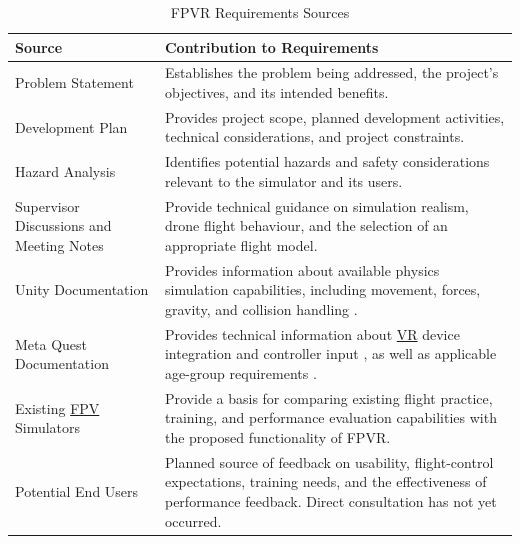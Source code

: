 \documentclass[12pt]{article}
\begin{document}
\begin{table}[htbp]
\centering
\small
\caption{FPVR Requirements Sources}
\label{tab:requirements-sources}

\begin{tabularx}{\textwidth}{@{}p{3.5cm} X@{}}
\toprule
\textbf{Source} &
\textbf{Contribution to Requirements} \\
\midrule

Problem Statement &
Establishes the problem being addressed, the
project's objectives, and its intended benefits. \\

\addlinespace

Development Plan &
Provides project scope, planned development
activities, technical considerations, and
project constraints. \\

\addlinespace

Hazard Analysis &
Identifies potential hazards and safety
considerations relevant to the simulator
and its users. \\

\addlinespace

Supervisor Discussions and Meeting Notes &
Provide technical guidance on simulation realism,
drone flight behaviour, and the selection of
an appropriate flight model. \\

\addlinespace

Unity Documentation &
Provides information about available physics
simulation capabilities, including movement,
forces, gravity, and collision handling
\cite{unityRigidbody}. \\

\addlinespace

Meta Quest Documentation &
Provides technical information about \hyperlink{glos:VR}{VR} device
integration and controller input
\cite{metaQuestInput}, as well as applicable
age-group requirements \cite{metaAgeGroups}. \\

\addlinespace

Existing \hyperlink{glos:FPV}{FPV} Simulators &
Provide a basis for comparing existing flight
practice, training, and performance evaluation
capabilities with the proposed functionality
of FPVR. \\

\addlinespace

Potential End Users &
Planned source of feedback on usability,
flight-control expectations, training needs,
and the effectiveness of performance feedback.
Direct consultation has not yet occurred. \\

\bottomrule
\end{tabularx}
\end{table}
\end{document}
